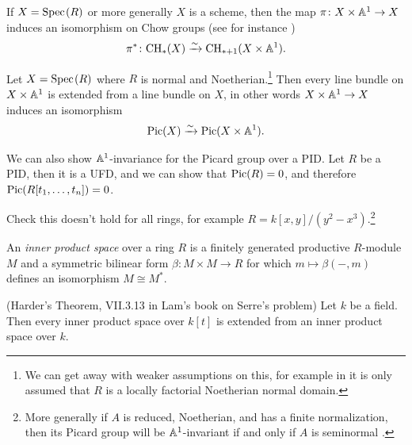 \documentclass[11pt,openany]{book}
\begin{document}
\begin{example} If $X = \text{Spec}\hspace{0.1em}(R)$ or more generally $X$ is a scheme, then the map $\pi \colon X \times \mathbb{A}^1 \to X$ induces an isomorphism on Chow groups (see for instance \cite[3.3]{Fulton})
\begin{align*}
    \pi^\ast \colon \mathrm{CH}_\ast(X) \xrightarrow{\sim} \mathrm{CH}_{\ast+1}(X \times \mathbb{A}^1).
\end{align*}
\end{example}

\begin{example} Let $X = \text{Spec}\hspace{0.1em}(R)$ where $R$ is normal and Noetherian.\footnote{%
We can get away with weaker assumptions on this, for example in \cite[3.7.13]{Aravind} it is only assumed that $R$ is a locally factorial Noetherian normal domain.
}
Then every line bundle on $X \times \mathbb{A}^1$ is extended from a line bundle on $X$, in other words $X \times \mathbb{A}^1 \to X$ induces an isomorphism
\begin{align*}
    \mathrm{Pic}(X) \xrightarrow{\sim} \mathrm{Pic}(X \times\mathbb{A}^1).
\end{align*}
\end{example}

\begin{example} We can also show $\mathbb{A}^1$-invariance for the Picard group over a PID. Let $R$ be a PID, then it is a UFD, and we can show that $\mathrm{Pic}(R) = 0$, and therefore $\mathrm{Pic}(R[t_1, \ldots, t_n])=0$.
\end{example}




\begin{example} \cite[3.7.1.5]{Aravind}
Check this doesn't hold for all rings, for example $R = k[x,y]/(y^2-x^3)$.\footnote{%
More generally if $A$ is reduced, Noetherian, and has a finite normalization, then its Picard group will be $\mathbb{A}^1$-invariant if and only if $A$ is seminormal \cite[3.6]{Traverso}.
}
\end{example}

\begin{definition} An \textit{inner product space} over a ring $R$ is a finitely generated productive $R$-module $M$ and a symmetric bilinear form $\beta \colon M \times M \to R$ for which $m \mapsto \beta(-,m)$ defines an isomorphism $M \cong M^\ast$.
\end{definition}


\begin{theorem} (Harder's Theorem, VII.3.13 in Lam's book on Serre's problem) Let $k$ be a field. Then every inner product space over $k[t]$ is extended from an inner product space over $k$.
\end{theorem}
\end{document}
